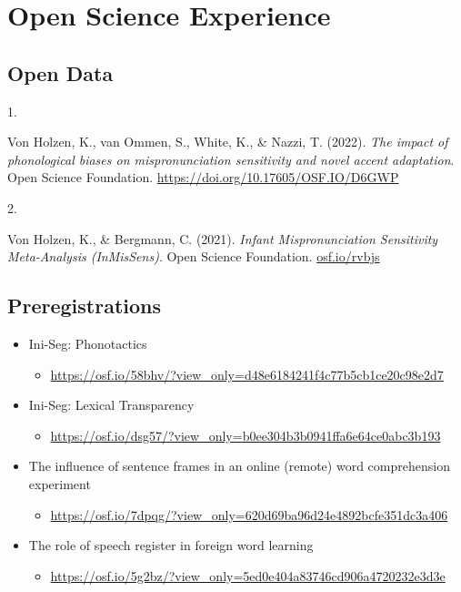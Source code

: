 \documentclass[10pt,a4paper,]{article}
\providecommand{\tightlist}{%
  \setlength{\itemsep}{0pt}\setlength{\parskip}{0pt}}
\newlength{\cslhangindent}
\newlength{\csllabelwidth}
\newcommand{\CSLLeftMargin}[1]{\parbox[t]{\csllabelwidth}{\hfill #1~}}
\newcommand{\CSLRightInline}[1]{\parbox[t]{\linewidth - \cslhangindent - \csllabelwidth}{#1}\vspace{0.8ex}}
\begin{document}
\hypertarget{open-science-experience}{%
\section{Open Science Experience}\label{open-science-experience}}

\hypertarget{open-data}{%
\subsection{Open Data}\label{open-data}}

\hypertarget{bibliography}{}
\leavevmode{}%
\CSLLeftMargin{1. }%
\CSLRightInline{Von Holzen, K., van Ommen, S., White, K., \& Nazzi, T.
(2022). \emph{The impact of phonological biases on mispronunciation
sensitivity and novel accent adaptation}. Open Science Foundation.
\url{https://doi.org/10.17605/OSF.IO/D6GWP}}

\leavevmode{}%
\CSLLeftMargin{2. }%
\CSLRightInline{Von Holzen, K., \& Bergmann, C. (2021). \emph{Infant
Mispronunciation Sensitivity Meta-Analysis (InMisSens)}. Open Science
Foundation. \href{https://osf.io/rvbjs}{osf.io/rvbjs}}

\hypertarget{preregistrations}{%
\subsection{Preregistrations}\label{preregistrations}}

\begin{itemize}
\tightlist
\item
  Ini-Seg: Phonotactics

  \begin{itemize}
  \tightlist
  \item
    \url{https://osf.io/58bhv/?view_only=d48e6184241f4c77b5cb1ce20c98e2d7}
  \end{itemize}
\item
  Ini-Seg: Lexical Transparency

  \begin{itemize}
  \tightlist
  \item
    \url{https://osf.io/dsg57/?view_only=b0ee304b3b0941ffa6e64ce0abc3b193}
  \end{itemize}
\item
  The influence of sentence frames in an online (remote) word
  comprehension experiment

  \begin{itemize}
  \tightlist
  \item
    \url{https://osf.io/7dpqg/?view_only=620d69ba96d24e4892bcfe351dc3a406}
  \end{itemize}
\item
  The role of speech register in foreign word learning

  \begin{itemize}
  \tightlist
  \item
    \url{https://osf.io/5g2bz/?view_only=5ed0e404a83746cd906a4720232e3d3e}
  \end{itemize}
\end{itemize}
\end{document}
